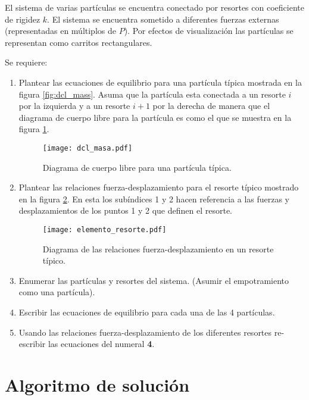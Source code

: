 El sistema de varias partículas se encuentra conectado por resortes con 
coeficiente de rigidez $k$. El sistema se encuentra sometido a diferentes 
fuerzas externas (representadas en múltiplos de $P$). Por efectos de 
visualización las partículas se representan como carritos rectangulares.

Se requiere:

\begin{enumerate}

\item
Plantear las ecuaciones de equilibrio para una partícula típica mostrada en 
la figura \ref{fig:dcl_mass}. Asuma que la partícula esta conectada a un 
resorte $i$ por la izquierda y a un resorte $i+1$ por la derecha de manera que 
el diagrama de cuerpo libre para la partícula es como el que se muestra en la 
figura \ref{fig:dcl_masa}.

\begin{figure}[H]
\centering
\texttt{[image: dcl\_masa.pdf]}
\caption{Diagrama de cuerpo libre para una partícula típica.}
\label{fig:dcl_masa}
\end{figure}

\item
Plantear las relaciones fuerza-desplazamiento para el resorte típico 
mostrado en la figura \ref{fig:elemento_resorte}. En esta los subíndices 1 y 2 
hacen referencia a las fuerzas y desplazamientos de los puntos 1 y 2 que 
definen el resorte.
\begin{figure}[H]
\centering
\texttt{[image: elemento\_resorte.pdf]}
\caption{Diagrama de las relaciones fuerza-desplazamiento en un resorte 
típico.}
\label{fig:elemento_resorte}
\end{figure}

\item
Enumerar las partículas y resortes del sistema. (Asumir el empotramiento 
como una partícula).

\item
Escribir las ecuaciones de equilibrio para cada una de las 4 partículas.

\item
Usando las relaciones fuerza-desplazamiento de los diferentes resortes 
re-escribir las ecuaciones del numeral \textbf{4}.

\end{enumerate}

\section{Algoritmo de solución}

